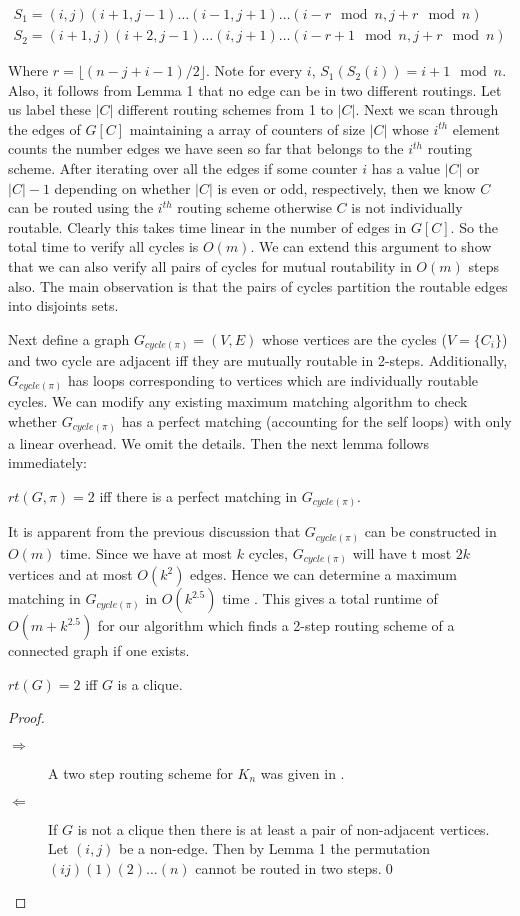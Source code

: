 \documentclass[runningheads,a4paper]{llncs}
\begin{document}
\begin{align}
S_1 = (i,j)(i+1,j-1)\ldots(i-1,j+1)\ldots(i - r \mod n, j + r \mod n)\\
S_2 = (i+1,j)(i+2,j-1)\ldots(i,j+1)\ldots(i - r + 1 \mod n, j + r \mod n)
\end{align} 

\noindent Where $r = \lfloor (n-j+i-1)/2 \rfloor$. Note for every $i$, $S_1(S_2(i)) = i+1 \mod n$. Also, it follows from Lemma 1 that no edge can be in two different routings. Let us label these $|C|$ different routing schemes from 1 to $|C|$. Next we scan through the edges of $G[C]$ maintaining a array of counters of size $|C|$ whose $i^{th}$ element counts the number edges we have seen so far that belongs to the $i^{th}$ routing scheme. After iterating over all the edges if some counter $i$ has a value $|C|$ or $|C|-1$ depending on whether $|C|$ is even or odd, respectively, then we know $C$ can be routed using the $i^{th}$ routing scheme otherwise $C$ is not individually routable. Clearly this takes time linear in the number of edges  in $G[C]$. So the total time to verify all cycles is $O(m)$. We can extend this argument to show that we can also verify all pairs of cycles for mutual routability in $O(m)$ steps also. The main observation is that the pairs of cycles partition the routable edges into disjoints sets. 

Next define a graph $G_{cycle(\pi)} = (V ,E)$ whose vertices are the cycles ($V = \{C_i\}$) and two cycle are adjacent iff they are mutually routable in 2-steps. Additionally, $G_{cycle(\pi)}$ has loops corresponding to vertices which are individually routable cycles. We can modify any existing maximum matching algorithm to check whether $G_{cycle(\pi)}$ has a perfect matching (accounting for the self loops) with only a linear overhead. We omit the details. Then the next lemma follows immediately:
\begin{lemma}
	$rt(G,\pi) = 2$ iff there is a perfect matching in $G_{cycle(\pi)}$.
\end{lemma}
\noindent It is apparent from the previous discussion that $G_{cycle(\pi)}$ can be constructed in $O(m)$ time. Since we have at most $k$ cycles,  $G_{cycle(\pi)}$ will have t most $2k$ vertices and at most $O(k^2)$ edges. 
Hence we can determine a maximum matching in $G_{cycle(\pi)}$ in  $O(k^{2.5})$ time \cite{10}. This gives a total runtime of $O(m + k^{2.5})$ for our algorithm which finds a 2-step routing scheme of a connected graph if one exists.
\begin{corollary}
	$rt(G) = 2$ iff $G$ is a clique.
\end{corollary}
\begin{proof}
	\begin{description}
		\item[$\Rightarrow$ ] A two step routing scheme for $K_n$ was given in \cite{5}.
		\item[$\Leftarrow $] If $G$ is not a clique then there is at least a pair of non-adjacent vertices. Let $(i,j)$ be a non-edge. Then by Lemma 1 the permutation $(ij)(1)(2)\ldots(n)$ cannot be routed in two steps.\qed
	\end{description}
\end{proof}
\end{document}
